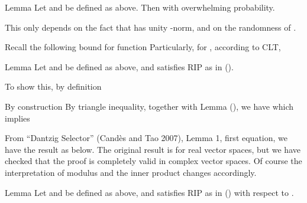 \Result
{Lemma}
{
Let  and  be defined as above.
Then
%
%
with overwhelming probability.
}

This only depends on the fact that  has unity -norm, and on the randomness of .

Recall the following bound for  function
Particularly, for , according to CLT,

\color[red]{(To be done)}

\Result
{Lemma}
{
Let  and  be defined as above, and  satisfies RIP as in ().
%
}

To show this, by definition
%

By construction
By triangle inequality, together with Lemma (), we have
which implies

From ``Dantzig Selector'' (Cand\`es and Tao 2007), Lemma 1, first equation, we have the result as below.
The original result is for real vector spaces, but we have checked that the proof is completely valid in complex vector spaces.
Of course the interpretation of modulus and the inner product changes accordingly.


\Result
{Lemma}
{
Let  and  be defined as above, and  satisfies RIP as in () with respect to .
%
%
}

